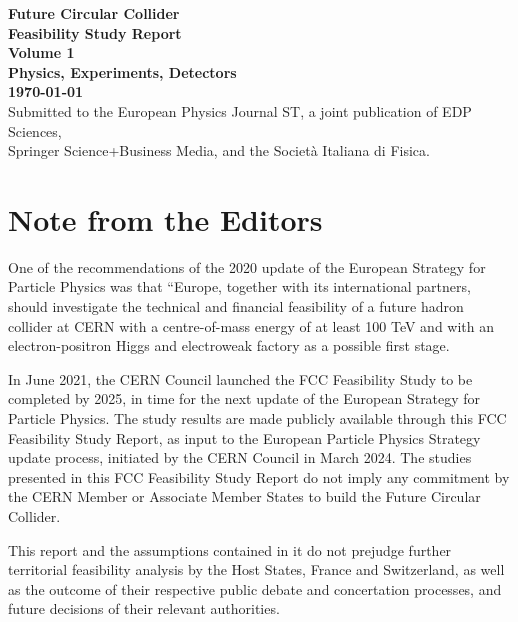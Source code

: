 \begin{titlepage}
		\begin{center}
		\textbf{\Large Future Circular Collider}\\
        \vspace{0.5cm}
        \textbf{\LARGE Feasibility Study Report}\\
        \vspace{8 cm}
         \textbf{\Huge Volume 1}\\
        \vspace{1cm}
        \textbf{\Huge Physics, Experiments, Detectors}\\
        \vspace{3 cm}
        \textbf{ \today } \\
        \vspace*{\fill}
Submitted to the European Physics Journal ST, a joint publication of EDP Sciences,\\Springer Science+Business Media, and the Società Italiana di Fisica.
        \end{center}
\end{titlepage}

\section*{Note from the Editors}

\noindent One of the recommendations of the 2020 update of the European Strategy for Particle Physics was that “Europe, together with its international partners, should investigate the technical and financial feasibility of a future hadron collider at CERN with a centre-of-mass energy of at least 100 TeV and with an electron-positron Higgs and electroweak factory as a possible first stage.

\noindent In June 2021, the CERN Council launched the FCC Feasibility Study to be completed by 2025, in time for the next update of the European Strategy for Particle Physics. The study results are made publicly available through this FCC Feasibility Study Report, as input to the European Particle Physics Strategy update process, initiated by the CERN Council in March 2024. The studies presented in this FCC Feasibility Study Report do not imply any commitment by the CERN Member or Associate Member States to build the Future Circular Collider.

\noindent This report and the assumptions contained in it do not prejudge further territorial feasibility analysis by the Host States, France and Switzerland, as well as the outcome of their respective public debate and concertation processes, and future decisions of their relevant authorities.

